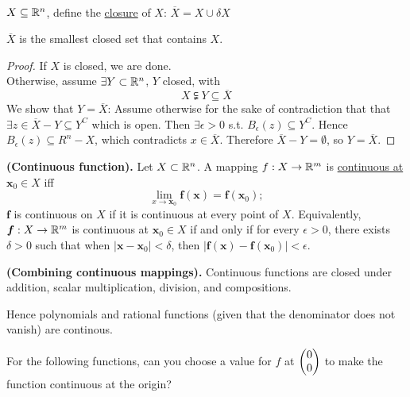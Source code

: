 \\

\begin{defn}
  $X \subseteq \mathbb{R}^n$, define the \ul{closure} of $X$: $\overline{X}=X\cup \delta X$
\end{defn}
\begin{theorem}
  $\overline{X}$ is the smallest closed set that contains $X$.
\end{theorem}
\begin{proof}
  If $X$ is closed, we are done. \\
  Otherwise, assume $\exists Y\subset \mathbb{R}^n$, $Y$ closed, with
  \[X\subsetneqq Y \subseteq \overline{X}\]
  We show that $Y=\overline{X}$: Assume otherwise for the sake of contradiction that that $\exists z\in \overline{X} - Y\subseteq Y^C$ which is open. Then $\exists \epsilon > 0$ s.t. $B_\epsilon (z)\subseteq Y^C$. Hence $B_\epsilon (z)\subseteq R^n-X $, which contradicts $x\in \overline{X}$. Therefore $\overline{X}-Y=\emptyset$, so $Y=\overline{X}$.
\end{proof}

\begin{defn}
  \textbf{(Continuous function). } Let $X\subset \mathbb{R}^n$. A mapping $f : X\rightarrow \mathbb{R}^m$ is \ul{continuous at} $\bm{x}_0\in X$ iff
  \[\lim_{x\rightarrow \bm{x}_0} \bm{f}(\bm{x}) = \bm{f}(\bm{x}_0);\]
  $\bm{f}$ is continuous on $X$ if it is continuous at every point of $X$. Equivalently, $\bm{f}: X\rightarrow \mathbb{R}^m$ is continuous at $\bm{x}_0\in X$ if and only if for every $\epsilon > 0$, there exists $\delta>0$ such that when $|\bm{x}-\bm{x}_0|<\delta$, then $|\bm{f}(\bm{x})-\bm{f}(\bm{x}_0)|<\epsilon$.
\end{defn}

\begin{theorem}
  \textbf{(Combining continuous mappings).} Continuous functions are closed under addition, scalar multiplication, division, and compositions.
\end{theorem}

\begin{lemma}
Hence polynomials and rational functions (given that the denominator does not vanish) are continous.
\end{lemma}

 For the following functions, can you choose a value for $f$ at $\begin{pmatrix} 0 \\ 0 \end{pmatrix}$ to make the function continuous at the origin?

